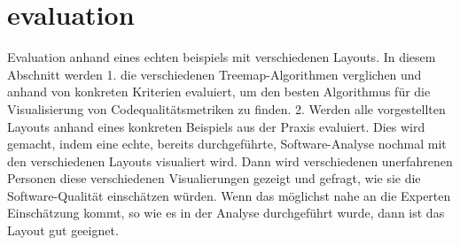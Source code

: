 \chapter{evaluation} \label{sec:Evaluation}

Evaluation anhand eines echten beispiels mit verschiedenen Layouts.
In diesem Abschnitt werden 1. die verschiedenen Treemap-Algorithmen verglichen und anhand von konkreten Kriterien evaluiert, um den besten Algorithmus für die Visualisierung von Codequalitätsmetriken zu finden. 2. Werden alle vorgestellten Layouts anhand eines konkreten Beispiels aus der Praxis evaluiert.
Dies wird gemacht, indem eine echte, bereits durchgeführte, Software-Analyse nochmal mit den verschiedenen Layouts visualiert wird. Dann wird verschiedenen unerfahrenen Personen diese verschiedenen Visualierungen gezeigt und gefragt, wie sie die Software-Qualität einschätzen würden. Wenn das möglichst nahe an die Experten Einschätzung kommt, so wie es in der Analyse durchgeführt wurde, dann ist das Layout gut geeignet. 
